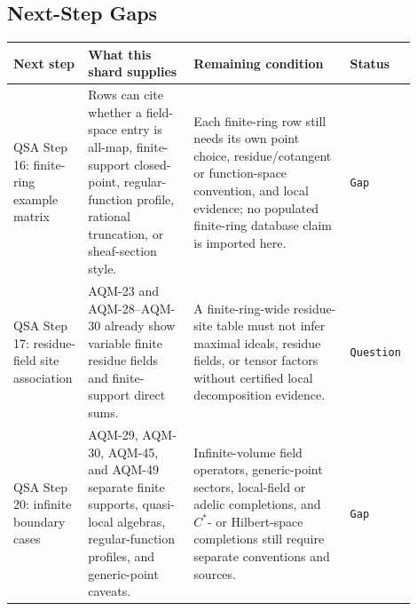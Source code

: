 \subsection{Next-Step Gaps}

\begin{center}
\small\setlength{\tabcolsep}{3pt}
\begin{tabular}{p{0.16\linewidth}p{0.25\linewidth}p{0.37\linewidth}p{0.12\linewidth}}
\toprule
Next step & What this shard supplies & Remaining condition & Status \\
\midrule
QSA Step 16: finite-ring example matrix &
Rows can cite whether a field-space entry is all-map, finite-support
closed-point, regular-function profile, rational truncation, or sheaf-section
style. &
Each finite-ring row still needs its own point choice, residue/cotangent or
function-space convention, and local evidence; no populated finite-ring
database claim is imported here. &
\texttt{Gap} \\
\addlinespace
QSA Step 17: residue-field site association &
AQM-23 and AQM-28--AQM-30 already show variable finite residue fields and
finite-support direct sums. &
A finite-ring-wide residue-site table must not infer maximal ideals, residue
fields, or tensor factors without certified local decomposition evidence. &
\texttt{Question} \\
\addlinespace
QSA Step 20: infinite boundary cases &
AQM-29, AQM-30, AQM-45, and AQM-49 separate finite supports, quasi-local
algebras, regular-function profiles, and generic-point caveats. &
Infinite-volume field operators, generic-point sectors, local-field or
adelic completions, and \(C^*\)- or Hilbert-space completions still require
separate conventions and sources. &
\texttt{Gap} \\
\bottomrule
\end{tabular}
\end{center}
